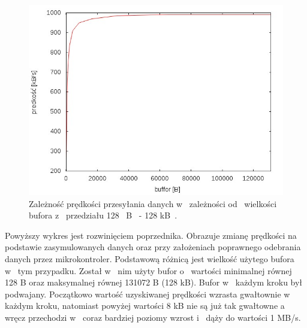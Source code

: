 \documentclass{BscUS}
\begin{document}
\begin{figure}[H]
{
\centering
\captionsetup{justification=centering}
\includegraphics[width=1\textwidth]{./img/S_bbuf2}
\caption{Zależność prędkości przesyłania danych w~ zależności od~ wielkości bufora z~ przedziału 128~ B~ - 128 kB~.}
\label{fig:S_bbuf2}
}
\end{figure}
\noindent Powyższy wykres jest rozwinięciem poprzednika. Obrazuje zmianę prędkości na podstawie zasymulowanych danych oraz przy założeniach poprawnego odebrania danych przez mikrokontroler. Podstawową różnicą jest wielkość użytego bufora w~ tym przypadku. Został w~ nim użyty bufor o~ wartości minimalnej równej 128 B oraz maksymalnej równej 131072 B (128 kB). Bufor w~ każdym kroku był podwajany. Początkowo wartość uzyskiwanej prędkości wzrasta gwałtownie w~ każdym kroku, natomiast powyżej wartości 8 kB nie są już tak gwałtowne a~ wręcz przechodzi w~ coraz bardziej poziomy wzrost i~ dąży do wartości 1 MB/s. 
\newline
\end{document}
